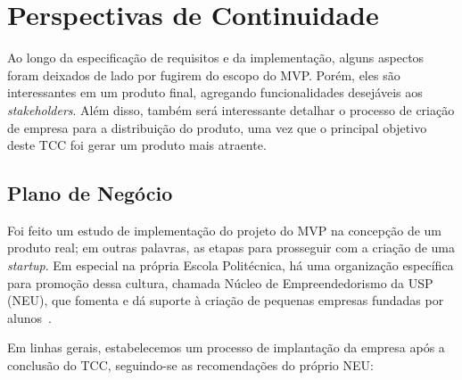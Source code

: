 \documentclass[]{politex}
\begin{document}
\section{Perspectivas de Continuidade}

Ao longo da especificação de requisitos e da implementação, alguns aspectos
foram deixados de lado por fugirem do escopo do MVP. Porém, eles são
interessantes em um produto final, agregando funcionalidades desejáveis aos
\textit{stakeholders}. Além disso, também será interessante detalhar o processo
de criação de empresa para a distribuição do produto, uma vez que o principal
objetivo deste TCC foi gerar um produto mais atraente.

\subsection{Plano de Negócio}

Foi feito um estudo de implementação do projeto do MVP na concepção de um
produto real; em outras palavras, as etapas para prosseguir com a criação de uma
\textit{startup}. Em especial na própria Escola Politécnica, há uma organização
específica para promoção dessa cultura, chamada Núcleo de Empreendedorismo da
USP (NEU), que fomenta e dá suporte à criação de pequenas empresas fundadas por
alunos~\cite{neu}.

Em linhas gerais, estabelecemos um processo de implantação da empresa após a
conclusão do TCC, seguindo-se as recomendações do próprio NEU:
\end{document}
